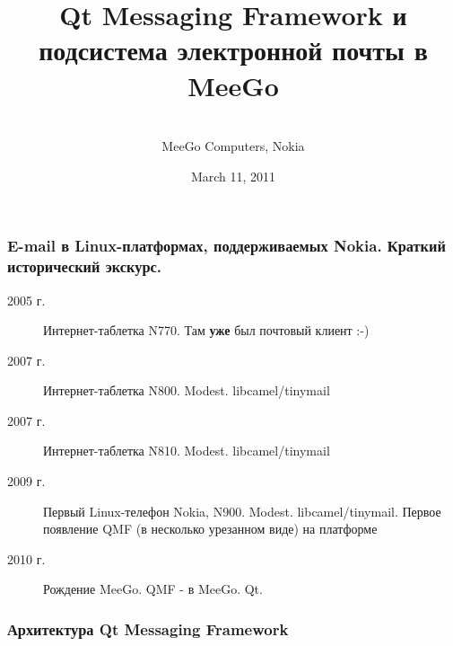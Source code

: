 \documentclass[compress,hyperref={linkcolor=blue,pdftex,unicode}]{beamer}
\date{March 11, 2011}
\author[]{\myhref{mailto:vitaly.repin@nokia.com}{В.А. Репин}\\ MeeGo Computers, Nokia}
\title[\tiny QMF, E-Mail в MeeGo]{Qt Messaging Framework и подсистема электронной почты в MeeGo}
\institute[\tiny MeeGo]{MeeGo}
\begin{document}
\large

\begin{frame}
\titlepage
\end{frame}

\begin{frame}
\frametitle{E-mail в Linux-платформах, поддерживаемых Nokia. Краткий исторический экскурс.}
\begin{description}
\item[2005 г.] Интернет-таблетка N770. Там \textbf{уже} был почтовый клиент :-)
\pause
\item[2007 г.] Интернет-таблетка N800. Modest. libcamel/tinymail
\pause
\item[2007 г.] Интернет-таблетка N810. Modest. libcamel/tinymail
\pause
\item[2009 г.] Первый Linux-телефон Nokia, N900. Modest. libcamel/tinymail. Первое появление QMF (в несколько урезанном виде)
на платформе
\pause
\item[2010 г.] Рождение MeeGo. QMF - в MeeGo. Qt.
\end{description}
\end{frame}

\begin{frame}
\frametitle{Архитектура Qt Messaging Framework}
\centerline{}
\end{frame}
\end{document}
